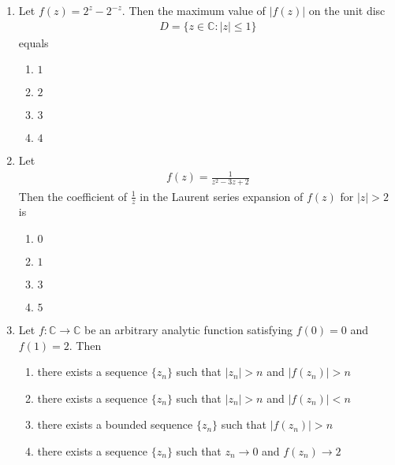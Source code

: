 \documentclass[journal]{IEEEtran}
\numberwithin{equation}{enumi}
\numberwithin{figure}{enumi}
\begin{document}
\begin{enumerate}
\begin{enumerate}
\end{enumerate}



\item Let $f(z) = 2^z - 2^{-z}$. Then the maximum value of $|f(z)|$ on the unit disc 
\begin{align*}
D = \{ z \in \mathbb{C} : |z| \leq 1 \}
\end{align*}
equals      \hfill{}
\begin{multicols}{4}
\begin{enumerate}
    \item $1$
    \item $2$
    \item $3$
    \item $4$
\end{enumerate}
\end{multicols}



\item Let        \hfill{}
\begin{align*}
f(z) = \frac{1}{z^2 - 3z + 2}
\end{align*}
Then the coefficient of $\frac{1}{z}$ in the Laurent series expansion of $f(z)$ for $|z| > 2$ is  
\begin{multicols}{4}
\begin{enumerate}
    \item $0$
    \item $1$
    \item $3$
    \item $5$
\end{enumerate}
\end{multicols}


\item Let $f: \mathbb{C} \rightarrow \mathbb{C}$ be an arbitrary analytic function satisfying $f(0) = 0$ and $f(1) = 2$. Then  \hfill{}

\begin{enumerate}
\item  there exists a sequence $\{z_n\}$ such that $|z_n| > n$ and $|f(z_n)| > n$
\item there exists a sequence $\{z_n\}$ such that $|z_n| > n$ and $|f(z_n)| < n$
\item there exists a bounded sequence $\{z_n\}$ such that $|f(z_n)| > n$
\item there exists a sequence $\{z_n\}$ such that $z_n \rightarrow 0$ and $f(z_n) \rightarrow 2$
\end{enumerate}



\end{enumerate}
\end{document}
